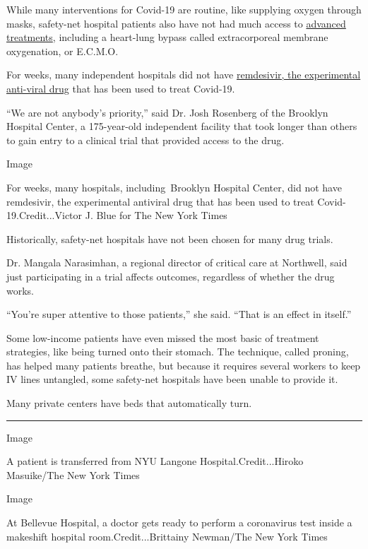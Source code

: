 While many interventions for Covid-19 are routine, like supplying oxygen
through masks, safety-net hospital patients also have not had much
access to
\href{https://www.nytimes.com/2020/04/26/health/coronavirus-patient-ventilator.html}{advanced
treatments}, including a heart-lung bypass called extracorporeal
membrane oxygenation, or E.C.M.O.

For weeks, many independent hospitals did not have
\href{https://www.nytimes.com/2020/04/29/health/gilead-remdesivir-coronavirus.html}{remdesivir,
the experimental anti-viral drug} that has been used to treat Covid-19.

``We are not anybody's priority,'' said Dr. Josh Rosenberg of the
Brooklyn Hospital Center, a 175-year-old independent facility that took
longer than others to gain entry to a clinical trial that provided
access to the drug.

Image

For weeks, many hospitals, including~Brooklyn Hospital Center, did not
have remdesivir, the experimental antiviral drug that has been used to
treat Covid-19.Credit...Victor J. Blue for The New York Times

Historically, safety-net hospitals have not been chosen for many drug
trials.

Dr. Mangala Narasimhan, a regional director of critical care at
Northwell, said just participating in a trial affects outcomes,
regardless of whether the drug works.

``You're super attentive to those patients,'' she said. ``That is an
effect in itself.''

Some low-income patients have even missed the most basic of treatment
strategies, like being turned onto their stomach. The technique, called
proning, has helped many patients breathe, but because it requires
several workers to keep IV lines untangled, some safety-net hospitals
have been unable to provide it.

Many private centers have beds that automatically turn.

\begin{center}\rule{0.5\linewidth}{\linethickness}\end{center}

Image

A patient is transferred from NYU Langone Hospital.Credit...Hiroko
Masuike/The New York Times

Image

At Bellevue Hospital, a doctor gets ready to perform a coronavirus test
inside a makeshift hospital room.Credit...Brittainy Newman/The New York
Times

